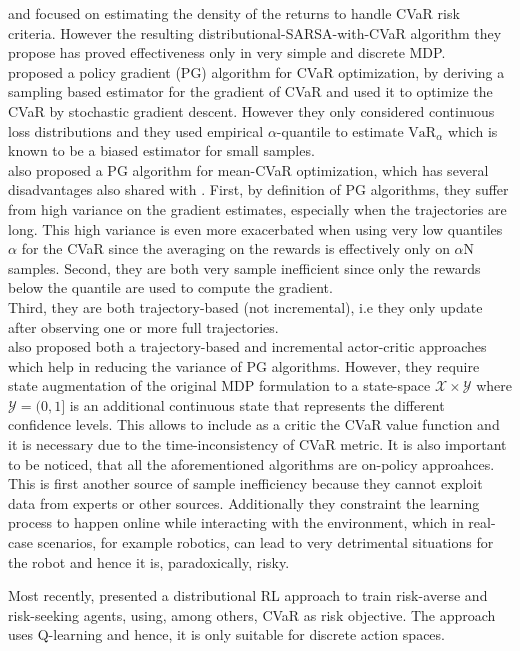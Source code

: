 \citet{Morimura2010a} and \citet{Morimura2010b}
focused on estimating the density of the returns
to handle CVaR risk criteria. However the resulting distributional-SARSA-with-CVaR algorithm they propose
has  proved  effectiveness  only  in  very  simple  and discrete MDP.\\
\citet{Tamar2015a} proposed a policy gradient (PG) algorithm for CVaR optimization, by deriving a 
sampling based estimator for the gradient of CVaR and used it to optimize the CVaR by stochastic gradient descent.
However they only considered continuous loss distributions and they used empirical $\alpha$-quantile to estimate 
$\text{VaR}_\alpha$ which is known to be a biased estimator for small samples.\\
\citet{Chow2014} also proposed a PG algorithm for mean-CVaR optimization, which has several disadvantages
also shared with \citet{Tamar2015}. First, by definition of PG algorithms, they suffer from
high variance on the gradient estimates, especially when the trajectories are long. This high variance
is even more exacerbated when using very low quantiles $\alpha$ for the CVaR 
since the averaging on the rewards is effectively only on $\alpha$N samples.
Second, they are both very sample inefficient since only the rewards below the quantile
are used to compute the gradient.\\
Third, they are both trajectory-based (not incremental), 
i.e they only update after observing one or more full trajectories.\\
\citet{Chow2014} also proposed both a trajectory-based and incremental actor-critic approaches which help
in reducing the variance of PG algorithms. However, they require state augmentation of the original MDP formulation to a
state-space $\mathcal{X} \times \mathcal{Y}$ where 
$\mathcal{Y} = (0,1]$ is an additional continuous state that represents the different confidence levels. 
This allows to include as a critic the CVaR value function and it is necessary due to 
the time-inconsistency of CVaR metric.
It is also important to be noticed, that all the aforementioned algorithms are on-policy approahces.
This is first another source of sample inefficiency
because they cannot exploit data from experts or other sources. Additionally they constraint the 
learning process to happen online while interacting with the environment, which in real-case scenarios,
for example robotics, can lead to very detrimental situations for the robot and hence it is,
paradoxically, risky.

Most recently, \citet{Dabney2018b} presented a distributional RL approach to train risk-averse and risk-seeking agents,
using, among others, CVaR as risk objective. The approach uses Q-learning
and hence, it is only suitable for discrete action spaces.

